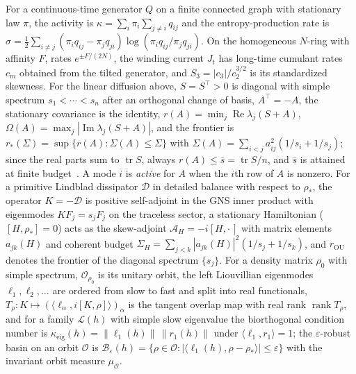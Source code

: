 \documentclass[11pt]{article}
\theoremstyle{definition}
\newcommand{\eps}{\varepsilon}
\begin{document}
For a continuous-time generator $Q$ on a finite connected graph with stationary law $\pi$, the activity is $\kappa=\sum_i\pi_i\sum_{j\ne i}q_{ij}$ and the entropy-production rate is $\sigma=\tfrac12\sum_{i\ne j}(\pi_iq_{ij}-\pi_jq_{ji})\log(\pi_iq_{ij}/\pi_jq_{ji})$.  On the homogeneous $N$-ring with affinity $F$, rates $e^{\pm F/(2N)}$, the winding current $J_t$ has long-time cumulant rates $c_m$ obtained from the tilted generator, and $S_3=|c_3|/c_2^{3/2}$ is its standardized skewness.  For the linear diffusion above, $S=S^\top>0$ is diagonal with simple spectrum $s_1<\cdots<s_n$ after an orthogonal change of basis, $A^\top=-A$, the stationary covariance is the identity, $r(A)=\min_j\operatorname{Re}\lambda_j(S+A)$, $\Omega(A)=\max_j|\operatorname{Im}\lambda_j(S+A)|$, and the frontier is $r_*(\Sigma)=\sup\{r(A):\Sigma(A)\le\Sigma\}$ with $\Sigma(A)=\sum_{i<j}a_{ij}^2(1/s_i+1/s_j)$; since the real parts sum to $\operatorname{tr} S$, always $r(A)\le\bar s=\operatorname{tr} S/n$, and $\bar s$ is attained at finite budget~\cite{LNP13}.  A mode $i$ is \emph{active} for $A$ when the $i$th row of $A$ is nonzero.  For a primitive Lindblad dissipator $\mathcal D$ in detailed balance with respect to $\rho_*$, the operator $K=-\mathcal D$ is positive self-adjoint in the GNS inner product with eigenmodes $KF_j=s_jF_j$ on the traceless sector, a stationary Hamiltonian ($[H,\rho_*]=0$) acts as the skew-adjoint $\mathcal A_H=-i[H,\cdot\,]$ with matrix elements $a_{jk}(H)$ and coherent budget $\Sigma_H=\sum_{j<k}|a_{jk}(H)|^2(1/s_j+1/s_k)$, and $r_{\mathrm{OU}}$ denotes the frontier of the diagonal spectrum $\{s_j\}$.  For a density matrix $\rho_0$ with simple spectrum, $\mathcal O_{\rho_0}$ is its unitary orbit, the left Liouvillian eigenmodes $\ell_1,\ell_2,\ldots$ are ordered from slow to fast and split into real functionals, $T_\rho:K\mapsto(\langle\ell_\alpha,i[K,\rho]\rangle)_\alpha$ is the tangent overlap map with real rank $\operatorname{rank}T_\rho$, and for a family $\mathcal L(h)$ with simple slow eigenvalue the biorthogonal condition number is $\kappa_{\mathrm{eig}}(h)=\|\ell_1(h)\|\,\|r_1(h)\|$ under $\langle\ell_1,r_1\rangle=1$; the $\eps$-robust basin on an orbit $\mathcal O$ is $\mathcal B_\eps(h)=\{\rho\in\mathcal O:|\langle\ell_1(h),\rho-\rho_*\rangle|\le\eps\}$ with the invariant orbit measure $\mu_\mathcal O$.
\end{document}
